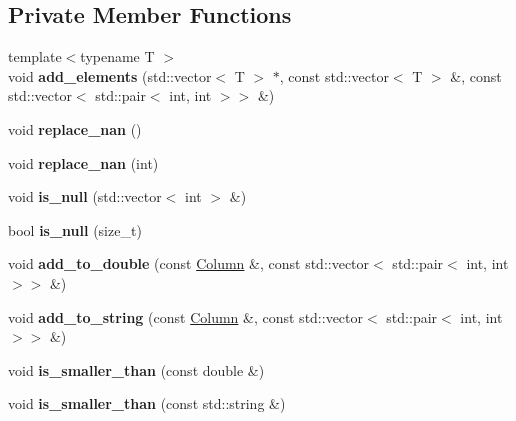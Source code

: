 \subsection*{Private Member Functions}
\begin{DoxyCompactItemize}
\item 
\mbox{\label{classColumn_a7a0741eff30c01cfbed5627e9cf263f5}} 
{\footnotesize template$<$typename T $>$ }\\void {\bfseries add\+\_\+elements} (std\+::vector$<$ T $>$ $\ast$, const std\+::vector$<$ T $>$ \&, const std\+::vector$<$ std\+::pair$<$ int, int $>$$>$ \&)
\item 
\mbox{\label{classColumn_ac56702c1c3e153d9434c89a9a471d130}} 
void {\bfseries replace\+\_\+nan} ()
\item 
\mbox{\label{classColumn_ae521b1b4d6717f928dc5d778f3dd6ef1}} 
void {\bfseries replace\+\_\+nan} (int)
\item 
\mbox{\label{classColumn_aeb84b641ffe0918fc7fbbd79e71e5763}} 
void {\bfseries is\+\_\+null} (std\+::vector$<$ int $>$ \&)
\item 
\mbox{\label{classColumn_abf57b536d1d132a0f3d8841f4388bbee}} 
bool {\bfseries is\+\_\+null} (size\+\_\+t)
\item 
\mbox{\label{classColumn_a0d4c790fa30f5da90cd47ddf4df2ea7a}} 
void {\bfseries add\+\_\+to\+\_\+double} (const \hyperlink{classColumn}{Column} \&, const std\+::vector$<$ std\+::pair$<$ int, int $>$$>$ \&)
\item 
\mbox{\label{classColumn_a6edd300552de8cb4d1d31310685aad7f}} 
void {\bfseries add\+\_\+to\+\_\+string} (const \hyperlink{classColumn}{Column} \&, const std\+::vector$<$ std\+::pair$<$ int, int $>$$>$ \&)
\item 
\mbox{\label{classColumn_ad33840850da11510dea2d045214f376c}} 
void {\bfseries is\+\_\+smaller\+\_\+than} (const double \&)
\item 
\mbox{\label{classColumn_a5f693c2940b4c8158bfd5391520d7369}} 
void {\bfseries is\+\_\+smaller\+\_\+than} (const std\+::string \&)
\end{DoxyCompactItemize}
